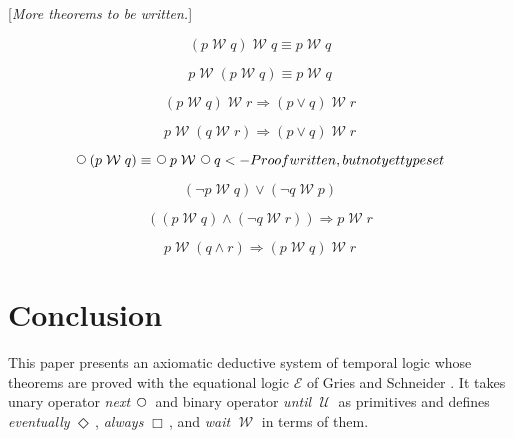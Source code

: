 \documentclass[fleqn, leqno]{article}
\newcommand{\impl}{\ensuremath{\Rightarrow}}        %
\newcommand{\Until}{\;\mathcal{U}\;}
\newcommand{\Wait}{\;\mathcal{W}\;}
\newcommand{\Next}{\;\,\text{\raisebox{3.5pt}{\circle{6}}}}
\newcommand{\Event}{\Diamond\,}
\newcommand{\Always}{\Box\,}
\begin{document}
[\textit{More theorems to be written.}]

\begin{equation}\label{E:waitAbsR}
(p \Wait q) \Wait q \equiv p \Wait q
\end{equation}

\begin{equation}\label{E:waitAbsL}
p \Wait (p \Wait q) \equiv p \Wait q
\end{equation}

\begin{equation}\label{E:waitImpAbsR}
(p \Wait q) \Wait r \impl (p \lor q) \Wait r
\end{equation}

\begin{equation}\label{E:waitImpAbsL}
p \Wait (q \Wait r) \impl (p \lor q) \Wait r
\end{equation}

\begin{equation}\label{E:waitNextDist}
\Next (p \Wait q) \equiv \Next p \Wait \Next q <- Proof written, but not yet typeset
\end{equation}

\begin{equation}\label{E:waitOrdering}
(\neg p \Wait q) \lor (\neg q \Wait p)
\end{equation}

\begin{equation}\label{E:waitOrderingTwo}
((p \Wait q) \land (\neg q \Wait r)) \impl p \Wait r
\end{equation}

\begin{equation}\label{E:waitOrderingThree}
p \Wait (q \land r) \impl (p \Wait q) \Wait r
\end{equation}





\section{Conclusion}

This paper presents an axiomatic deductive system of temporal logic whose theorems are proved with the equational
logic $\mathcal{E}$ of Gries and Schneider \cite{LADM}.
It takes unary operator \textit{next} $\Next$ and binary operator \textit{until} $\Until$ as primitives and defines
\textit{eventually} $\Event$, \textit{always} $\Always$, and \textit{wait} $\Wait$ in terms of them.\\
\end{document}
